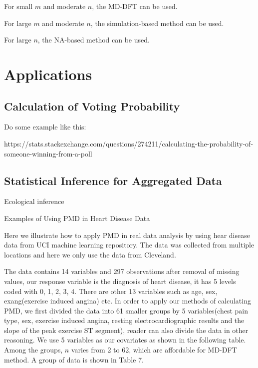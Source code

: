 \documentclass[12pt]{article}
\begin{document}
For small $m$ and moderate $n$, the MD-DFT can be used.

For large $m$ and moderate $n$, the simulation-based method can be used.

For large $n$, the NA-based method can be used.

\section{Applications}
\subsection{Calculation of Voting Probability}


Do some example like this:

https://stats.stackexchange.com/questions/274211/calculating-the-probability-of-someone-winning-from-a-poll




\subsection{Statistical Inference for Aggregated Data}\label{sec:model.est.inf}	

Ecological inference

Examples of Using PMD in Heart Disease Data

Here we illustrate how to apply PMD in real data analysis by using hear disease data from UCI machine learning repository. The data was collected from multiple locations and here we only use the data from Cleveland.


The data contains 14 variables and 297 observations after removal of missing values, our response variable is the diagnosis of heart disease, it has 5 levels coded with 0, 1, 2, 3, 4. There are other 13 variables such as age, sex, exang(exercise induced angina) etc. In order to apply our methods of calculating PMD, we first divided the data into 61 smaller groups by 5 variables(chest pain type, sex, exercise induced angina, resting electrocardiographic results and the slope of the peak exercise ST segment), reader can also divide the data in other reasoning. We use 5 variables as our covariates as shown in the following table. Among the groups, $n$ varies from 2 to 62, which are affordable for MD-DFT method. A group of data is shown in Table 7.
\end{document}
